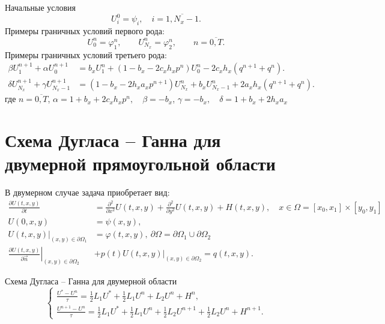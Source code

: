 \documentclass[a4paper,12pt]{article}
\begin{document}
Начальные условия
\begin{equation*}
  U^0_i = \psi_i, \quad i = \overline {1, N_x-1}.
\end{equation*}
Примеры граничных условий первого рода:
\begin{equation*}
  U^n_0 = \varphi_1^n, \qquad U^n_{N_x} = \varphi_2^n, \qquad n = \overline{0,T}.
\end{equation*}
Примеры граничных условий третьего рода:
\begin{align*}
  \beta U^{n+1}_{1} + \alpha U^{n+1}_{0} &=
  b_x U^{n}_{1} + \left(1 - b_x - 2 c_x h_x p^n \right) U^{n}_{0} - 2 c_x h_x (q^{n+1} + q^{n}). \\
  \delta U^{n+1}_{N_x} + \gamma U^{n+1}_{N_x-1} &=
  \left(1 - b_x - 2 h_x a_x p^{n+1} \right) U^{n}_{N_x} + b_x U^{n}_{N_x-1} + 2 a_x h_x \left( q^{n+1} + q^{n} \right).
\end{align*}
где $n = \overline{0,T}$,
$\alpha = 1 + b_x  + 2 c_x h_x p^n, \quad \beta = - b_x$, $\gamma = - b_x, \quad \delta =  1 + b_x + 2 h_x a_x $

\hrulefill

\section{Схема Дугласа -- Ганна для двумерной прямоугольной области}
\label{sec:heat2d}

В двумерном случае задача приобретает вид:
\begin{align}
  \label{eq:2d-problem-eq}
  \frac{\partial U(t,x,y)}{\partial t} &= \frac{\partial^2}{\partial x^2} U(t,x,y) + \frac{\partial^2}{\partial y^2} U(t,x,y) + H(t,x,y),
                                         \quad x \in \Omega = [x_0,x_1] \times [y_0, y_1]\\
  \label{eq:2d-problem-ic}
  U(0, x, y) &= \psi(x, y),\\
  \label{eq:2d-problem-bc1}
  \left. U(t,x, y) \right|_{(x,y) \in \partial \Omega_1} &=  \varphi(t, x, y),   \ \partial \Omega = \partial \Omega_1 \cup \partial \Omega_2 \\
  \label{eq:2d-problem-bc3}
  \left. \frac{ \partial U(t,x,y) }{\partial \vec n} \right|_{(x,y) \in \partial \Omega_2}& +
                                                                                            p(t)\left. U(t,x,y) \right|_{(x,y) \in \partial \Omega_2}  = q(t, x, y).
\end{align}


Схема Дугласа -- Ганна для двумерной области
\begin{equation*}
  \begin{cases}
    \frac{U^* - U^n}{\tau} = \frac{1}{2} L_1 U^* + \frac{1}{2} L_1 U^n + L_2 U^n + H^n, \\
    \frac{U^{n+1} - U^n}{\tau} = \frac{1}{2} L_1 U^* + \frac{1}{2} L_1 U^n + \frac{1}{2} L_2 U^{n+1} + \frac{1}{2} L_2 U^n + H^{n+1}.
  \end{cases}
\end{equation*}
\end{document}
